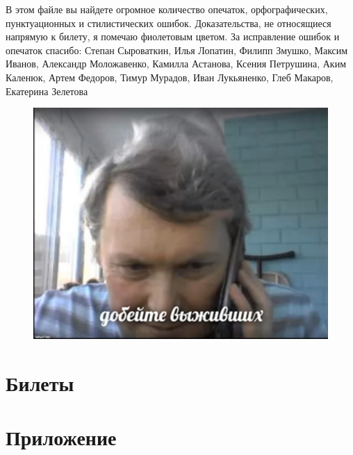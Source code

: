 \documentclass[12pt]{book}
\begin{document}
	
	
	
	
	\tableofcontents
	
	\newpage
	В этом файле вы найдете огромное количество опечаток, орфографических, пунктуационных и стилистических ошибок. Доказательства, не относящиеся напрямую к билету, я помечаю {\color{violet} фиолетовым} цветом. За исправление ошибок и опечаток спасибо: Степан Сыроваткин, Илья Лопатин, Филипп Змушко, Максим Иванов, Александр Моложавенко, Камилла Астанова, Ксения Петрушина, Аким Каленюк, Артем Федоров, Тимур Мурадов, Иван Лукьяненко, Глеб Макаров, Екатерина Зелетова 
	
	
	
	
	
	\begin{figure}[h!]
		\centering
		\includegraphics[scale=0.5]{pic/konst}
	\end{figure} 
	
	

\chapter{Билеты}

	
	
	
	
	
	
	
	
	
	
	
	
	
	
	
	
	
	
	
	
	
	
	
	
	
	
	
	
	
	
	
	
	
	
	
	
	
	
	
	
	
	
	
	
	
	

	




\chapter{Приложение}

 
\end{document}
